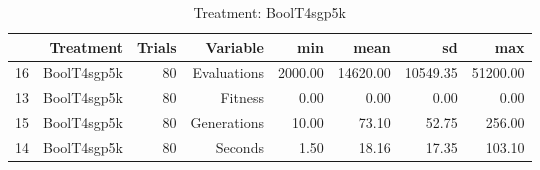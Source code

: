 \begin{table}[ht]
\centering
\begin{tabular}{rrrrrrrr}
  \hline
 & Treatment & Trials & Variable & min & mean & sd & max \\ 
  \hline
16 & BoolT4sgp5k &  80 & Evaluations & 2000.00 & 14620.00 & 10549.35 & 51200.00 \\ 
  13 & BoolT4sgp5k &  80 & Fitness & 0.00 & 0.00 & 0.00 & 0.00 \\ 
  15 & BoolT4sgp5k &  80 & Generations & 10.00 & 73.10 & 52.75 & 256.00 \\ 
  14 & BoolT4sgp5k &  80 & Seconds & 1.50 & 18.16 & 17.35 & 103.10 \\ 
   \hline
\end{tabular}
\caption{Treatment: BoolT4sgp5k} 
\end{table}
